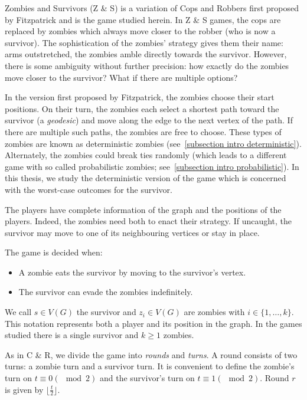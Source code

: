 Zombies and Survivors (Z \& S) is a variation of Cops and Robbers first proposed by Fitzpatrick \cite{fitzpatrick2016deterministic} and is the game studied herein. In Z \& S games, the
cops are replaced by zombies which always move closer to the robber (who is now a survivor). The sophistication of the zombies' strategy gives them their name:  arms outstretched, the zombies amble directly towards the survivor. However, there is some ambiguity without further precision: how exactly do the zombies move closer to the survivor? What if there are multiple options?

In the version first proposed by Fitzpatrick, the zombies choose their start positions. On their turn, the zombies each select a shortest path toward the survivor (a \textit{geodesic}) and move along the edge to the next vertex of the path. If there are multiple such paths, the zombies are free to choose. These types of zombies are known as deterministic zombies (see~\ref{subsection intro deterministic}). Alternately, the zombies could break ties randomly (which leads to a different game with so called probabilistic zombies; see~\ref{subsection intro probabilistic}). In this thesis, we study the deterministic version of the game which is concerned with the worst-case outcomes for the survivor.

The players have complete information of the graph and the positions of the players. Indeed, the zombies need both to enact their strategy. If uncaught, the survivor may move to one of its neighbouring vertices or stay in place.

The game is decided when:
\begin{itemize}
\item A zombie eats the survivor by moving to the survivor's vertex.
\item The survivor can evade the zombies indefinitely.
\end{itemize}

We call $s \in V(G)$ the survivor and $z_i \in V(G)$ are zombies with $i \in \{1, \dots, k\}$.
This notation represents both a player and its position in the graph.
In the games studied there is a single survivor and $k \geq 1$ zombies.

As in C \& R, we divide the game into \textit{rounds} and \textit{turns}. A round consists of two turns: a zombie turn and a survivor turn.
It is convenient to define the zombie's turn on $t \equiv 0 (\mod{2})$ and the survivor's turn on $t \equiv 1 (\mod{2})$.
Round $r$ is given by $\lfloor \frac{t}{2} \rfloor$.

